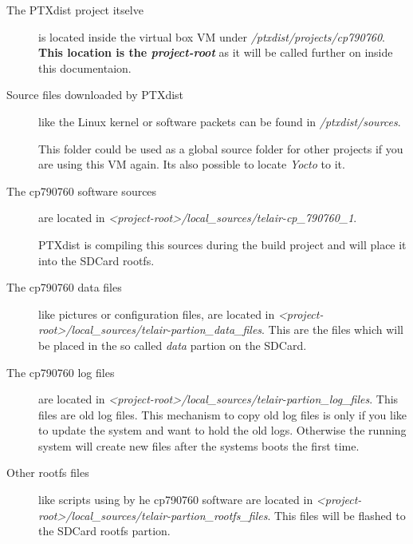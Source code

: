 \begin{description}
    \item[The PTXdist project itselve] is located inside the virtual box VM
        under  \newline
        \textit{/ptxdist/projects/cp790760}. \\
        \textbf{This location is the
            \textit{project-root}} as it will be called further on inside this
        documentaion.

    \item[Source files downloaded by PTXdist] like the Linux kernel or software
        packets can be found in \textit{/ptxdist/sources}.

        This folder could be
        used as a global source folder for other projects if you are using this
        VM again. Its also possible to locate \textit{Yocto} to it.

    \item[The cp790760 software sources] are located in \newline
        \textit{<project-root>/local\_sources/telair-cp\_790760\_1}.

        PTXdist is compiling this sources during the build project and will
        place it into the SDCard rootfs.

    \item[The cp790760 data files] like pictures or configuration files, are
        located in \newline
        \textit{<project-root>/local\_sources/telair-partion\_data\_files}. This
        are the files which will be placed in the so called \textit{data}
        partion on the SDCard.

    \item[The cp790760 log files] are located in \newline
        \textit{<project-root>/local\_sources/telair-partion\_log\_files}. This
        files are old log files. This mechanism to copy old log files is only
        if you like to update the system and want to hold the old logs.
        Otherwise the running system will create new files after the systems
        boots the first time.

    \item[Other rootfs files] like scripts using by he cp790760 software are
        located in
        \textit{<project-root>/local\_sources/telair-partion\_rootfs\_files}.
        This files will be flashed to the SDCard rootfs partion.


\end{description}
